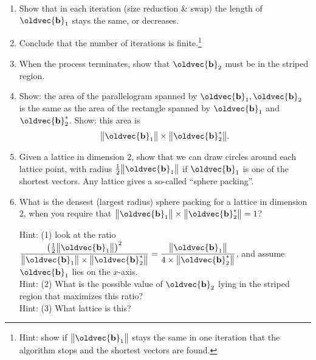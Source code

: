 \documentclass[10pt,a4paper]{article}
\renewcommand{\vec}[1]{\oldvec{\mathbf{#1}}}
\DeclarePairedDelimiter{\norm}{\big\lVert}{\big\rVert}
\begin{document}
\begin{enumerate}
	\item
		Show that in each iteration (size reduction \& swap) the length of \(\vec{b}_1\) stays the same, or decreases.
	
	\item Conclude that the number of iterations is finite.\footnote{Hint: show if \(\norm{\vec{b}_1}\) stays the same in one iteration that the algorithm stops and the shortest vectors are found.}

	\item When the process terminates, show that \(\vec{b}_2\) must be in the striped region.

	\item Show: the area of the parallelogram spanned by \(\vec{b}_1, \vec{b}_2\) is the same as the area of the rectangle spanned by \(\vec{b}_1\) and \(\vec{b}_2^*\). Show: this area is
	\[
		\norm{\vec{b}_1} \times \norm{\vec{b}_2^*}.
	\]

	\item
		Given a lattice in dimension \(2\), show that we can draw circles around each lattice point, with radius \(\frac12 \norm{\vec{b}_1}\) if \(\vec{b}_1\) is one of the shortest vectors.
		Any lattice gives a so-called ``sphere packing''.
	
	\item What is the densest (largest radius) sphere packing for a lattice in dimension 2,
		when you require that \(\norm{\vec{b}_1} \times \norm{\vec{b}_2^*} = 1\)?

		Hint: (1) look at the ratio \(\displaystyle \frac{{\left(\frac12 \norm{\vec{b}_1}\right)}^2}{\norm{\vec{b}_1} \times \norm{\vec{b}_2^*}} = \frac{\norm{\vec{b}_1}}{4 \times \norm{\vec{b}_2^*}}\), and assume \(\vec{b}_1\) lies on the \(x\)-axis. \\
		{\color{white}Hint: }(2) What is the possible value of \(\vec{b}_2\) lying in the striped region that maximizes this ratio? \\
		{\color{white}Hint: }(3) What lattice is this?
		

\end{enumerate}
\end{document}
